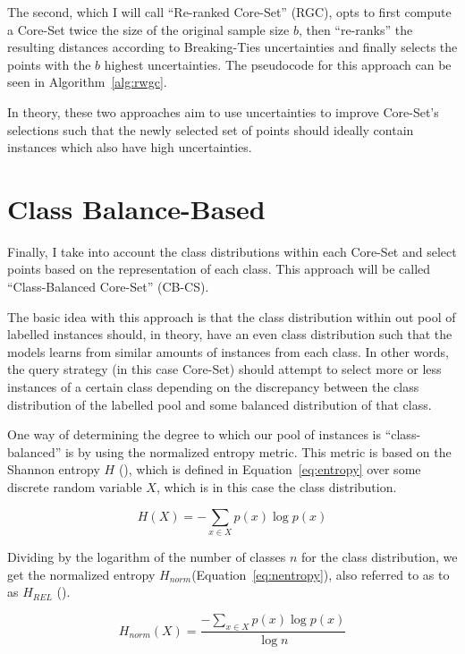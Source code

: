 \documentclass[english,bachelor,ul]{webisthesis} %
\begin{document}
The second, which I will call ``Re-ranked Core-Set'' (RGC), opts to first compute a Core-Set twice the size of the original sample size $b$, then ``re-ranks'' the resulting distances according to Breaking-Ties uncertainties and finally selects the points with the $b$ highest uncertainties. The pseudocode for this approach can be seen in Algorithm~\ref{alg:rwgc}.

In theory, these two approaches aim to use uncertainties to improve Core-Set's selections such that the newly selected set of points should ideally contain instances which also have high uncertainties.

\section{Class Balance-Based}

Finally, I take into account the class distributions within each Core-Set and select points based on the representation of each class. This approach will be called ``Class-Balanced Core-Set'' (CB-CS).

The basic idea with this approach is that the class distribution within out pool of labelled instances should, in theory, have an even class distribution such that the models learns from similar amounts of instances from each class. In other words, the query strategy (in this case Core-Set) should attempt to select more or less instances of a certain class depending on the discrepancy between the class distribution of the labelled pool and some balanced distribution of that class.

One way of determining the degree to which our pool of instances is ``class-balanced'' is by using the normalized entropy metric. This metric is based on the Shannon entropy $ H $ (\cite{DBLP:journals/bstj/Shannon48}), which is defined in Equation~\ref{eq:entropy} over some discrete random variable $ X $, which is in this case the class distribution.

\begin{equation}\label{eq:entropy}
    H(X) = -\sum_{x \in X} p(x) \log p(x)
\end{equation}

Dividing by the logarithm of the number of classes $n$ for the class distribution, we get the normalized entropy $ H_{norm} $(Equation~\ref{eq:nentropy}), also referred to as to as $ H_{REL} $ (\cite{wilcox1967indices}).

\begin{equation}\label{eq:nentropy}
    H_{norm}(X) = \frac{-\sum_{x \in X} p(x) \log p(x)}{\log n}
\end{equation}
\end{document}
